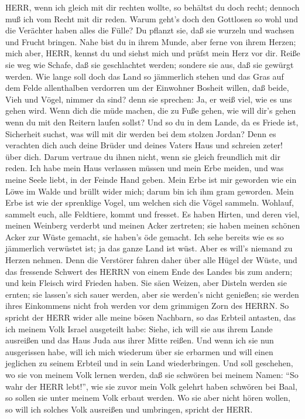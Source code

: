 HERR, wenn ich gleich mit dir rechten wollte, so behältst
du doch recht; dennoch muß ich vom Recht mit dir reden. Warum geht's
doch den Gottlosen so wohl und die Verächter haben alles die Fülle?
 Du pflanzt sie, daß sie wurzeln und wachsen und Frucht
bringen. Nahe bist du in ihrem Munde, aber ferne von ihrem Herzen;
 mich aber, HERR, kennst du und siehst mich und prüfst mein
Herz vor dir. Reiße sie weg wie Schafe, daß sie geschlachtet werden;
sondere sie aus, daß sie gewürgt werden.  Wie lange soll
doch das Land so jämmerlich stehen und das Gras auf dem Felde
allenthalben verdorren um der Einwohner Bosheit willen, daß beide, Vieh
und Vögel, nimmer da sind? denn sie sprechen: Ja, er weiß viel, wie es
uns gehen wird.  Wenn dich die müde machen, die zu Fuße
gehen, wie will dir's gehen wenn du mit den Reitern laufen sollst? Und
so du in dem Lande, da es Friede ist, Sicherheit suchst, was will mit
dir werden bei dem stolzen Jordan?  Denn es verachten dich
auch deine Brüder und deines Vaters Haus und schreien zeter! über dich.
Darum vertraue du ihnen nicht, wenn sie gleich freundlich mit dir reden.
 Ich habe mein Haus verlassen müssen und mein Erbe meiden,
und was meine Seele liebt, in der Feinde Hand geben.  Mein
Erbe ist mir geworden wie ein Löwe im Walde und brüllt wider mich; darum
bin ich ihm gram geworden.  Mein Erbe ist wie der sprenklige
Vogel, um welchen sich die Vögel sammeln. Wohlauf, sammelt euch, alle
Feldtiere, kommt und fresset.  Es haben Hirten, und deren
viel, meinen Weinberg verderbt und meinen Acker zertreten; sie haben
meinen schönen Acker zur Wüste gemacht, sie haben's öde gemacht.
 Ich sehe bereits wie es so jämmerlich verwüstet ist; ja
das ganze Land ist wüst. Aber es will's niemand zu Herzen nehmen.
 Denn die Verstörer fahren daher über alle Hügel der Wüste,
und das fressende Schwert des HERRN von einem Ende des Landes bis zum
andern; und kein Fleisch wird Frieden haben.  Sie säen
Weizen, aber Disteln werden sie ernten; sie lassen's sich sauer werden,
aber sie werden's nicht genießen; sie werden ihres Einkommens nicht froh
werden vor dem grimmigen Zorn des HERRN.  So spricht der
HERR wider alle meine bösen Nachbarn, so das Erbteil antasten, das ich
meinem Volk Israel ausgeteilt habe: Siehe, ich will sie aus ihrem Lande
ausreißen und das Haus Juda aus ihrer Mitte reißen.  Und
wenn ich sie nun ausgerissen habe, will ich mich wiederum über sie
erbarmen und will einen jeglichen zu seinem Erbteil und in sein Land
wiederbringen.  Und soll geschehen, wo sie von meinem Volk
lernen werden, daß sie schwören bei meinem Namen: ``So wahr der HERR
lebt!'', wie sie zuvor mein Volk gelehrt haben schwören bei Baal, so
sollen sie unter meinem Volk erbaut werden.  Wo sie aber
nicht hören wollen, so will ich solches Volk ausreißen und umbringen,
spricht der HERR.

